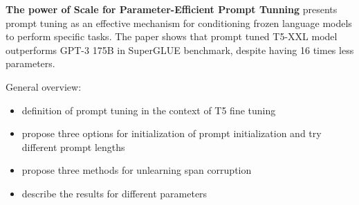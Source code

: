 \textbf{The power of Scale for Parameter-Efficient Prompt Tunning}\cite{lester2021power} presents prompt tuning as an effective mechanism for conditioning frozen language models to perform specific tasks. The paper shows that prompt tuned T5-XXL model outperforms GPT-3 175B in SuperGLUE benchmark, despite having 16 times less parameters.


General overview:

\begin{itemize}
    \item definition of prompt tuning in the context of T5 fine tuning
    \item propose three options for initialization of prompt initialization and try different prompt lengths
    \item propose three methods for unlearning span corruption
    \item describe the results for different parameters
\end{itemize}

